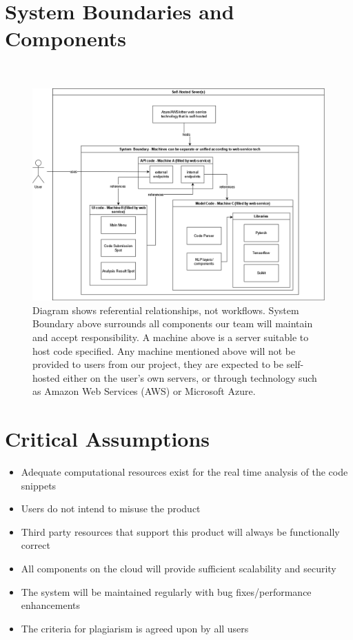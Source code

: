 \documentclass{article}
\begin{document}
\section{System Boundaries and Components}
\,
\begin{figure}
    \hspace{-3cm}
        \includegraphics[height=.58\textheight]{./assets/Component_Border.png}
\caption{Diagram shows referential relationships, not workflows. System Boundary above surrounds all components our team will maintain and accept responsibility. A machine above is a server suitable to host code specified. Any machine mentioned above will not be provided to users from our project, they are expected to be self-hosted either on the user's own servers, or through technology such as Amazon Web Services (AWS) or Microsoft Azure.}
\end{figure}



\section{Critical Assumptions}
\begin{itemize}
    \item Adequate computational resources exist for the real time analysis of the code snippets
    \item Users do not intend to misuse the product
    \item Third party resources that support this product will always be functionally correct
    \item All components on the cloud will provide sufficient scalability and security
    \item The system will be maintained regularly with bug fixes/performance enhancements
    \item The criteria for plagiarism is agreed upon by all users
\end{itemize}
\end{document}
